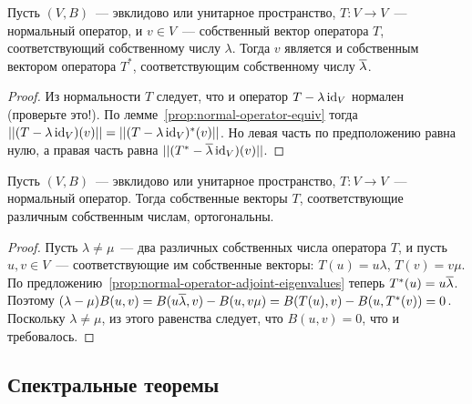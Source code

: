 \begin{proposition}\label{prop:normal-operator-adjoint-eigenvalues}
Пусть $(V,B)$~--- эвклидово или унитарное пространство,
$T\colon V\to V$~--- нормальный оператор, и $v\in V$~--- собственный
вектор оператора $T$, соответствующий собственному числу $\lambda$.
Тогда $v$ является и собственным вектором оператора $T^*$,
соответствующим собственному числу $\overline\lambda$.
\end{proposition}
\begin{proof}
Из нормальности $T$ следует, что и оператор $T - \lambda\operatorname{id}_V$
нормален (проверьте это!).
По лемме~\ref{prop:normal-operator-equiv} тогда
$||(T-\lambda\operatorname{id}_V)(v)|| = ||(T-\lambda\operatorname{id}_V)^*(v)||$.
Но левая часть по предположению равна нулю,
а правая часть равна $||(T^*-\overline\lambda\operatorname{id}_V)(v)||$.
\end{proof}

\begin{proposition}
Пусть $(V,B)$~--- эвклидово или унитарное пространство,
$T\colon V\to V$~--- нормальный оператор. Тогда собственные векторы
$T$, соответствующие различным собственным числам, ортогональны.
\end{proposition}
\begin{proof}
Пусть $\lambda\neq\mu$~--- два различных собственных числа
оператора $T$, и пусть $u,v\in V$~--- соответствующие им
собственные векторы: $T(u) = u\lambda$, $T(v) = v\mu$.
По предложению~\ref{prop:normal-operator-adjoint-eigenvalues}
теперь $T^*(u) = u\overline\lambda$.
Поэтому $(\lambda-\mu)B(u,v) = B(u\overline\lambda,v) - B(u,v\mu)
= B(T(u),v) - B(u,T^*(v)) = 0$.
Поскольку $\lambda\neq\mu$, из этого равенства следует, что
$B(u,v)=0$, что и требовалось.
\end{proof}

\subsection{Спектральные теоремы}


